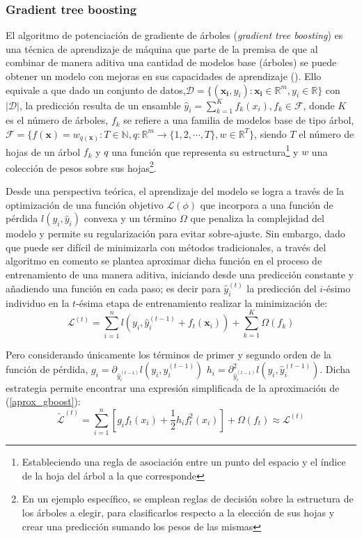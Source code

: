 \documentclass[9pt,twocolumn,twoside]{ilcss}
\begin{document}
\subsubsection{Gradient tree boosting}
El algoritmo de potenciación de gradiente de árboles (\emph{gradient tree boosting}) es una técnica de aprendizaje de máquina que parte de la premisa de que al combinar de manera aditiva una cantidad de modelos base (árboles) se puede obtener un modelo con mejoras en sus capacidades de aprendizaje (\cite{Chen:2016:XST:2939672.2939785}). Ello equivale a que dado un conjunto de datos,${\mathcal D} =\{(\mathbf{x_i}, y_i) : \mathbf{x_i}\in  \mathbb{R}^m, y_i\in  \mathbb{R} \}$ con $|{\mathcal D}|$, la predicción resulta de un ensamble $\hat{y}_i = \sum_{k=1}^K f_k(x_i), f_k \in \mathcal{F}$, donde $K$ es el número de árboles, $f_k$ se refiere a una familia de modelos base de tipo árbol, $\mathcal{F}=\{ f(\mathbf{x}) = w_{q(\mathbf{x})} :  T\in \mathbb{N}, q: \mathbb{R}^m \rightarrow \{1,2,\cdots,T\} ,  w\in \mathbb{R}^T  \}$, siendo $T$ el número de hojas de un árbol $f_k$ y $q$ una función que representa su estructura\footnote{Estableciendo una regla de asociación entre un punto del espacio y el índice de la hoja del árbol a la que corresponde} y $w$ una colección de pesos sobre sus hojas\footnote{En un ejemplo específico, se emplean reglas de decisión sobre la estructura de los árboles a elegir, para clasificarlos respecto a la elección de sus hojas y crear una predicción sumando los pesos de las mismas}.

Desde una perspectiva teórica, el aprendizaje del modelo se logra a través de la optimización de una función objetivo ${\mathcal L}(\phi)$ que incorpora a una función de pérdida $l(y_i, \hat{y}_i)$ convexa 
y un término $\Omega$ que penaliza la complejidad del modelo y permite su regularización para evitar sobre-ajuste. Sin embargo, dado que puede ser difícil de minimizarla con métodos tradicionales, a través del algoritmo en comento se plantea aproximar dicha función en el proceso de entrenamiento de una manera aditiva, iniciando desde una predicción constante y añadiendo una función en cada paso; es decir para $\hat{y}_i^{(t)}$ la predicción del $i$-ésimo individuo en la $t$-ésima etapa de entrenamiento realizar la minimización de:
\begin{equation}\label{aprox_gboost}
{\mathcal L}^{(t)} = \sum_{i=1}^n l(y_i, \hat{y}_i^{(t-1)}+f_t(\mathbf{x}_i)) + \sum_{k=1}^K \Omega(f_k)
\end{equation}

Pero considerando únicamente los términos de primer y segundo orden de la función de pérdida, $g_i = \partial_{\hat{y}_i^{(t-1)}} l(y_i, \hat{y}_i^{(t-1)})$  $h_i = \partial_{\hat{y}_i^{(t-1)}}^2 l(y_i, \hat{y}_i^{(t-1)})$. Dicha estrategia permite encontrar una expresión simplificada de la aproximación de (\ref{aprox_gboost}):
\begin{equation}
\tilde{{\mathcal L}}^{(t)} =\sum_{i=1}^n [g_i f_t(x_i) + \frac{1}{2} h_i f_t^2(x_i)] + \Omega(f_t) \approx {\mathcal L}^{(t)}
\end{equation}
\end{document}
